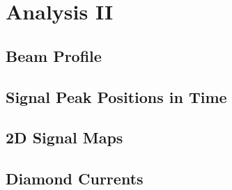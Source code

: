 \documentclass[9pt]{beamer}
\begin{document}
\section{Analysis II}
\subsection{Beam Profile}
\begin{frame}
\end{frame}
\subsection{Signal Peak Positions in Time}
\begin{frame}
\end{frame}
\subsection{2D Signal Maps}
\begin{frame}
\end{frame}
\subsection{Diamond Currents}
\begin{frame}
\end{frame}

\end{document}
